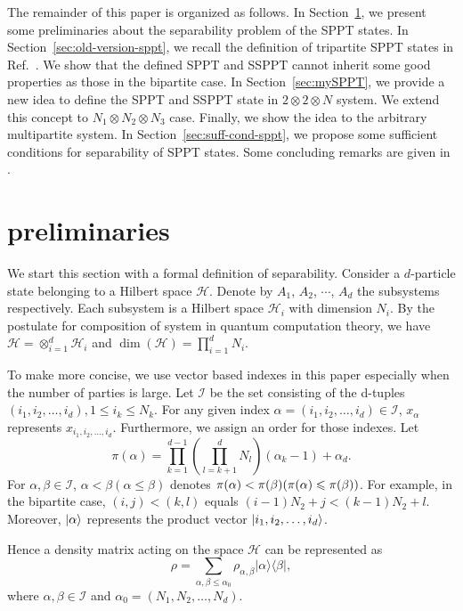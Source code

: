 The remainder of this paper is organized as follows.  In Section~\ref{sec:preliminaries}, we present some preliminaries
about the separability problem of the SPPT states. In Section~\ref{sec:old-version-sppt}, we recall the definition of
tripartite SPPT states in Ref.~\cite{SPPT3partite}. We show that the defined SPPT and SSPPT cannot inherit some good
properties as those in the bipartite case.  In Section~\ref{sec:mySPPT}, we provide a new idea to define the SPPT and
SSPPT state in $2\otimes 2 \otimes N$ system.  We extend this concept to
$N_1\otimes N_2\otimes N_3$ case. Finally, we show  the idea  to the arbitrary multipartite system.
In Section~\ref{sec:suff-cond-sppt}, we  propose
some  sufficient conditions for separability of SPPT states. Some concluding remarks are given in .


\section{preliminaries}
\label{sec:preliminaries}
We start this section with a formal definition of separability.  Consider a $d$-particle state belonging to a Hilbert
space $\mathcal{H}$. Denote by $A_1$, $A_2$, $\cdots$, $A_d$ the subsystems respectively.  Each subsystem is a Hilbert
space $\mathcal{H}_i$ with dimension $N_i$. By the postulate for composition of system in quantum computation theory, we have
$\mathcal{H} = \otimes_{i=1}^d \mathcal{H}_i$ and $\dim(\mathcal{H})=\prod_{i=1}^{d}N_i$.

To make more concise, we use vector based indexes in this paper especially when the number of parties is large. Let
$\mathcal{I}$ be the set consisting of the  d-tuples
$ (i_1,i_2,\ldots,i_d),1\leqslant i_k\leqslant N_k$. For any given index $\alpha= (i_1,i_2,\ldots,i_d)\in \mathcal{I}$, 
$x_{\alpha}$ represents $x_{i_1,i_2,\ldots,i_{d}}$. Furthermore, we  assign an order for those indexes. Let
\[
  \pi(\alpha)= \prod_{k=1}^{d-1}(\prod_{l=k+1}^{d}N_l)(\alpha_k-1)+\alpha_d.
\]
 For $\alpha,\beta\in \mathcal{I}$, $\alpha< \beta (\alpha\leqslant \beta)$ denotes $\pi(\alpha)<\pi(\beta)(\pi(\alpha)\linebreak\leqslant \pi(\beta))$. For example, in the bipartite case, $(i,j)<(k,l)$ equals $(i-1)N_2+j<(k-1)N_2+l$.  Moreover, $\ket{\alpha} $ represents the product vector $\ket{i_1,i_2,\ldots,i_d}$.

Hence a density matrix acting on the space $\mathcal{H}$ can be represented as
\begin{equation}
  \label{eq:37}
  \rho = \sum_{\alpha,\beta\leqslant \alpha_0}  \rho_{\alpha,\beta}| \alpha\rangle \langle \beta|, 
\end{equation}
where $\alpha,\beta\in\mathcal{I}$ and $\alpha_0 = (N_1,N_2,\ldots,N_d)$.

